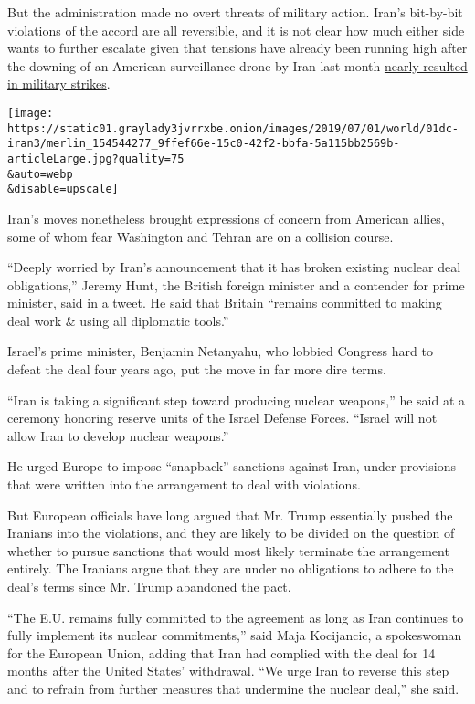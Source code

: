 But the administration made no overt threats of military action. Iran's
bit-by-bit violations of the accord are all reversible, and it is not
clear how much either side wants to further escalate given that tensions
have already been running high after the downing of an American
surveillance drone by Iran last month
\href{https://www.nytimes3xbfgragh.onion/2019/06/20/world/middleeast/iran-us-drone.html}{nearly
resulted in military strikes}.

\texttt{[image: https://static01.graylady3jvrrxbe.onion/images/2019/07/01/world/01dc-iran3/merlin\_154544277\_9ffef66e-15c0-42f2-bbfa-5a115bb2569b-articleLarge.jpg?quality=75\\\&auto=webp\\\&disable=upscale]}

Iran's moves nonetheless brought expressions of concern from American
allies, some of whom fear Washington and Tehran are on a collision
course.

``Deeply worried by Iran's announcement that it has broken existing
nuclear deal obligations,'' Jeremy Hunt, the British foreign minister
and a contender for prime minister, said in a tweet. He said that
Britain ``remains committed to making deal work \& using all diplomatic
tools.''

Israel's prime minister, Benjamin Netanyahu, who lobbied Congress hard
to defeat the deal four years ago, put the move in far more dire terms.

``Iran is taking a significant step toward producing nuclear weapons,''
he said at a ceremony honoring reserve units of the Israel Defense
Forces. ``Israel will not allow Iran to develop nuclear weapons.''

He urged Europe to impose ``snapback'' sanctions against Iran, under
provisions that were written into the arrangement to deal with
violations.

But European officials have long argued that Mr. Trump essentially
pushed the Iranians into the violations, and they are likely to be
divided on the question of whether to pursue sanctions that would most
likely terminate the arrangement entirely. The Iranians argue that they
are under no obligations to adhere to the deal's terms since Mr. Trump
abandoned the pact.

``The E.U. remains fully committed to the agreement as long as Iran
continues to fully implement its nuclear commitments,'' said Maja
Kocijancic, a spokeswoman for the European Union, adding that Iran had
complied with the deal for 14 months after the United States'
withdrawal. ``We urge Iran to reverse this step and to refrain from
further measures that undermine the nuclear deal,'' she said.

